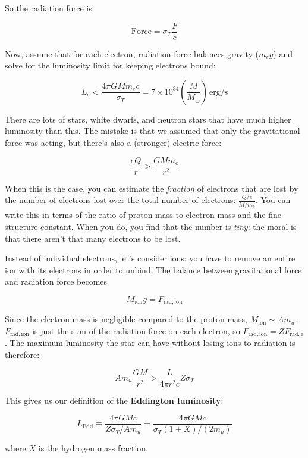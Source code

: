 \documentclass[12pt, letterpaper, preprint]{aastex}
\newcommand{\ledd}{L_{\mathrm{Edd}}}
\begin{document}
\begin{enumerate}
So the radiation force is

\begin{equation}
\mathrm{Force} = \sigma_T \frac{F}{c}
\end{equation}

Now, assume that for each electron, radiation force balances gravity ($m_e g$) and solve for the luminosity limit for keeping electrons bound:

$$ L_e < \frac{4 \pi G M m_e c}{\sigma_T} = 7 \times 10^{34} \left( \frac{M}{M_\odot} \right) \, \mathrm{erg/s}$$

There are lots of stars, white dwarfs, and neutron stars that have much higher luminosity than this. The mistake is that we assumed that only the gravitational force was acting, but there's also a (stronger) electric force:

$$ \frac{e Q}{r} > \frac{G M m_e} {r^2} $$

When this is the case, you can estimate the \emph{fraction} of electrons that are lost by the number of electrons lost over the total number of electrons: $\frac{Q/e}{M/m_p}$. You can write this in terms of the ratio of proton mass to electron mass and the fine structure constant. When you do, you find that the number is \emph{tiny}: the moral is that there aren't that many electrons to be lost. 

Instead of individual electrons, let's consider ions: you have to remove an entire ion with its electrons in order to unbind. The balance between gravitational force and radiation force becomes

$$ M_{\mathrm{ion}} g = F_{\mathrm{rad, ion}} $$

Since the electron mass is negligible compared to the proton mass, $M_{\mathrm{ion}} \sim A m_u$. $F_{\mathrm{rad, ion}}$ is just the sum of the radiation force on each electron, so $F_{\mathrm{rad, ion}} = Z F_{\mathrm{rad, e}}$. The maximum luminosity the star can have without losing ions to radiation is therefore: 

$$ A m_u \frac{GM}{r^2} > \frac{L}{4 \pi r^2 c} Z \sigma_T $$

This gives us our definition of the \textbf{Eddington luminosity}:

\begin{equation}
\ledd \equiv \frac{4 \pi G M c}{Z \sigma_T / A m_u} = \frac{4 \pi G M c}{\sigma_T (1 + X) / (2 m_u)}
\end{equation}

where $X$ is the hydrogen mass fraction. 


\end{enumerate}
\end{document}
